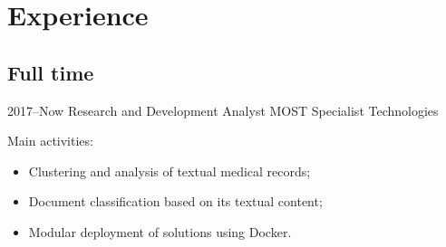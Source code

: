 \documentclass[a4paper]{cv-friggeri-x}
\begin{document}




\section{Experience}

\subsection{Full time}

\begin{entrylist}


\entry
    {2017--Now}
    {Research and Development Analyst}
    {MOST Specialist Technologies}
    {Main activities:
    \begin{itemize}
        \item Clustering and analysis of textual medical records;
        \item Document classification based on its textual content;
        \item Modular deployment of solutions using Docker.
    \end{itemize}}


\end{entrylist}
\end{document}

